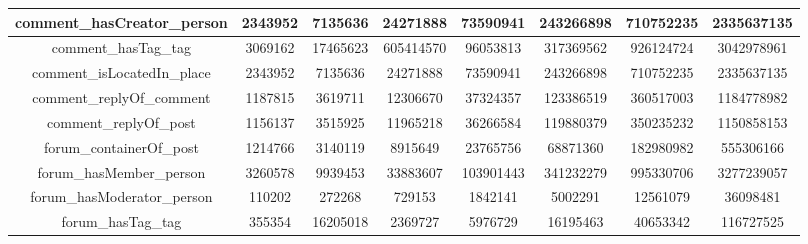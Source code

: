 \begin{table}[H]
{\begin{tabular} {| c | c | c | c | c | c | c | c |}
        \hline                                                                                                                      
				comment\_hasCreator\_person     & 2343952       & 7135636       & 24271888 & 73590941 & 243266898 & 710752235 & 2335637135 \\	
        \hline                                                                                                                      
        comment\_hasTag\_tag            & 3069162       & 17465623      & 605414570& 96053813 & 317369562 & 926124724 & 3042978961 \\	
        \hline                                                                                                                      
        comment\_isLocatedIn\_place     & 2343952       & 7135636       & 24271888 & 73590941 & 243266898 & 710752235 & 2335637135 \\	
        \hline                                                                                                                      
        comment\_replyOf\_comment       & 1187815       & 3619711       & 12306670 & 37324357 & 123386519 & 360517003 & 1184778982 \\	
        \hline                                                                                                                      
        comment\_replyOf\_post          & 1156137       & 3515925       & 11965218 & 36266584 & 119880379 & 350235232 & 1150858153 \\	
        \hline                                                                                                                      
        forum\_containerOf\_post        & 1214766       & 3140119       & 8915649  & 23765756 & 68871360  & 182980982 & 555306166  \\ 
        \hline                                                                                                                      
        forum\_hasMember\_person        & 3260578       & 9939453       & 33883607 & 103901443& 341232279 & 995330706 & 3277239057 \\	
        \hline                                                                                                                      
        forum\_hasModerator\_person     & 110202        & 272268        & 729153   & 1842141  & 5002291   & 12561079 	& 36098481 	 \\ 
        \hline                                                                                                                      
        forum\_hasTag\_tag              & 355354        & 16205018      & 2369727  & 5976729  & 16195463 	& 40653342 	& 116727525  \\ 

\end{tabular}}
\end{table}

